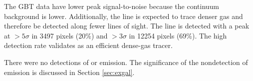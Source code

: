 The GBT \formaldehyde \twotwo data have lower peak signal-to-noise because the
continuum background is lower.  Additionally, the \twotwo line is expected to
trace denser gas and therefore be detected along fewer lines of sight.  The
\twotwo line is detected with a peak at $>5\sigma$ in 3497 pixels (20\%) and
$>3\sigma$ in 12254 pixels (69\%).  The high detection rate validates
\formaldehyde as an efficient dense-gas tracer.

There were no detections of \formaldehyde \oneone or \twotwo emission.  The
significance of the nondetection of emission is discussed in Section
\ref{sec:exgal}.

% 
% 
% 




